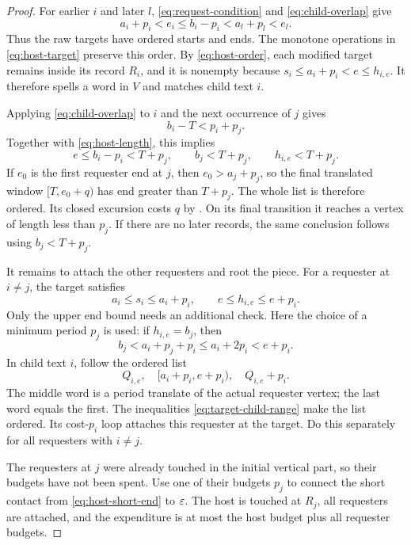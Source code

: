 \begin{proof}
For earlier $i$ and later $l$, \eqref{eq:request-condition} and \eqref{eq:child-overlap} give
\[
a_i+p_i<e_i\le b_i-p_i<a_l+p_l<e_l.
\]
Thus the raw targets have ordered starts and ends. The monotone operations in \eqref{eq:host-target} preserve this order. By \eqref{eq:host-order}, each modified target remains inside its record $R_i$, and it is nonempty because $s_i\le a_i+p_i<e\le h_{i,e}$. It therefore spells a word in $V$ and matches child text $i$.

Applying \eqref{eq:child-overlap} to $i$ and the next occurrence of $j$ gives
\[
b_i-T<p_i+p_j.
\]
Together with \eqref{eq:host-length}, this implies
\begin{equation}\label{eq:host-short-end}
e\le b_i-p_i<T+p_j,\qquad b_j<T+p_j,
\qquad h_{i,e}<T+p_j.
\end{equation}
If $e_0$ is the first requester end at $j$, then $e_0>a_j+p_j$, so the final translated window $[T,e_0+q)$ has end greater than $T+p_j$. The whole list is therefore ordered. Its closed excursion costs $q$ by . On its final transition it reaches a vertex of length less than $p_j$. If there are no later records, the same conclusion follows using $b_j<T+p_j$.

It remains to attach the other requesters and root the piece. For a requester at $i\ne j$, the target satisfies
\begin{equation}\label{eq:target-child-range}
a_i\le s_i\le a_i+p_i,
\qquad e\le h_{i,e}\le e+p_i.
\end{equation}
Only the upper end bound needs an additional check. Here the choice of a minimum period $p_j$ is used: if $h_{i,e}=b_j$, then
\[
b_j<a_i+p_j+p_i\le a_i+2p_i<e+p_i.
\]
In child text $i$, follow the ordered list
\[
Q_{i,e},\quad[a_i+p_i,e+p_i),\quad Q_{i,e}+p_i.
\]
The middle word is a period translate of the actual requester vertex; the last word equals the first. The inequalities \eqref{eq:target-child-range} make the list ordered. Its cost-$p_i$ loop attaches this requester at the target. Do this separately for all requesters with $i\ne j$.

The requesters at $j$ were already touched in the initial vertical part, so their budgets have not been spent. Use one of their budgets $p_j$ to connect the short contact from \eqref{eq:host-short-end} to $\varepsilon$. The host is touched at $R_j$, all requesters are attached, and the expenditure is at most the host budget plus all requester budgets.
\end{proof}
